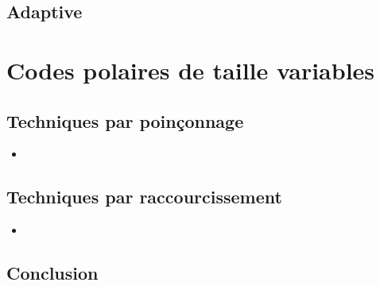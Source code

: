 \subsection{Adaptive}

\section{Codes polaires de taille variables}

\subsection{Techniques par poinçonnage}
\begin{itemize}
\item 
\end{itemize}
\subsection{Techniques par raccourcissement}
\begin{itemize}
\item 
\end{itemize}

\subsection*{Conclusion}
